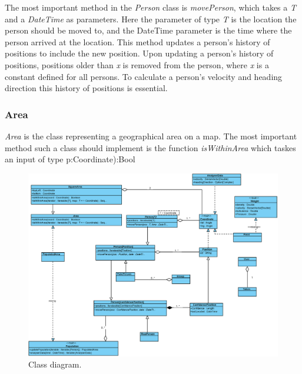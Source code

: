 The most important method in the \emph{Person} class is \emph{movePerson}, which takes a \emph{T} and a \emph{DateTime} as parameters. Here the parameter of type \emph{T} is the location the person should be moved to, and the DateTime parameter is the time where the person arrived at the location. This method updates a person's history of positions to include the new position. Upon updating a person's history of positions, positions older than \emph{x} is removed from the person, where \emph{x} is a constant defined for all persons. To calculate a person's velocity and heading direction this history of positions is essential.

\subsubsection{Area}

\emph{Area} is the class representing a geographical area on a map. The most important method such a class should implement is the function \emph{isWithinArea} which taskes an input of type p:Coordinate):Bool

\begin{figure}
\centering
\includegraphics[width=\linewidth]{figures/class.eps}
\caption{Class diagram.}
\label{fig:class}
\end{figure}
